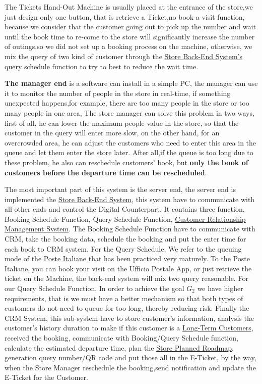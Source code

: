 \documentclass[a4paper,12pt]{book}
\begin{document}
The Tickets Hand-Out Machine is usually placed at the entrance of the store,we just design only one button, that is retrieve a Ticket,no book a visit function, because we consider that the customer going out to pick up the number and wait until the book time to re-come to the store will significantly increase the number of outings,so we did not set up a booking process on the machine, otherwise, we mix the query of two kind of customer through the \hyperref[Definitions]{Store Back-End System's} query schedule function to try to best to reduce the wait time.

\textbf{The manager end} is a software can install in a simple PC, the manager can use it to monitor the number of people in the store in real-time, if something unexpected happens,for example, there are too many people in the store or too many people in one area, The store manager can solve this problem in two ways, first of all, he can lower the maximum people value in the store, so that the customer in the query will enter more slow, on the other hand, for an overcrowded area, he can adjust the customers who need to enter this area in the queue and let them enter the store later. After all,if the queue is too long due to these problem, he also can reschedule customers’ book, but \textbf{only the book of customers before the departure time can be rescheduled}. 

The most important part of this system is the server end, the server end is implemented the \hyperref[Definitions]{Store Back-End System}, this system have to communicate with all other ends and control the Digital Counterpart. It contains three function, Booking Schedule Function, Query Schedule Function, \hyperref[Reference documents]{Customer Relationship Management System}. The Booking Schedule Function have to communicate with CRM, take the booking data, schedule the booking and put the enter time for each book to CRM system. For the Query Schedule, We refer to the queuing mode of the \hyperref[Reference documents]{Poste Italiane} that has been practiced very maturely. To the Poste Italiane, you can book your visit on the Ufficio Postale App, or just retrieve the ticket on the Machine, the back-end system will mix two query reasonable. For our Query Schedule Function, In order to achieve the goal $G_2$ we have higher requirements, that is we must have a better mechanism so that both types of customers do not need to queue for too long, thereby reducing risk. Finally the CRM System, this sub-system have to store customer's information, analysis the customer's history duration to make if this customer is a \hyperref[Definitions]{Long-Term Customers}, received the booking, communicate with Booking/Query Schedule function, calculate the  estimated departure time, plan the \hyperref[Definitions]{Store Planned Roadmap}, generation query number/QR code and put those all in the E-Ticket, by the way, when the Store Manager reschedule the booking,send notification and update the E-Ticket for the Customer.
\end{document}
